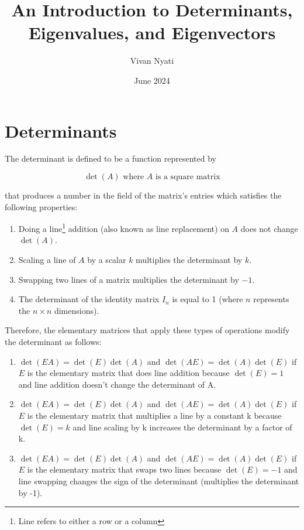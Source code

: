 \documentclass{article}
\title{An Introduction to Determinants, Eigenvalues, and Eigenvectors}
\author{Vivan Nyati}
\date{June 2024}
\begin{document}
\maketitle

\section*{Determinants}

The determinant is defined to be a function represented by 

\[
\text{$\det(A)$ where $A$ is a square matrix}
\]

\vspace{1mm}

that produces a number in the field of the matrix's entries which satisfies the following properties:

\begin{enumerate}
    \item Doing a line\footnote{Line refers to either a row or a column} addition (also known as line replacement) on \(A\) does not change \(\det(A)\).
    \item Scaling a line of \(A\) by a scalar \(k\) multiplies the determinant by \(k\).
    \item Swapping two lines of a matrix multiplies the determinant by \(-1\).
    \item The determinant of the identity matrix \(I_n\) is equal to 1 (where \(n\) represents the \(n \times n\) dimensions).
\end{enumerate}

Therefore, the elementary matrices that apply these types of operations modify the determinant as follows:

\begin{enumerate}
    \item \(\det(EA) = \det(E)\det(A)\) and \(\det(AE) = \det(A)\det(E)\) if \(E\) is the elementary matrix that does line addition because \(\det(E) = 1\) and line addition doesn't change the determinant of A.
    \item \(\det(EA) = \det(E)\det(A)\) and \(\det(AE) = \det(A)\det(E)\) if \(E\) is the elementary matrix that multiplies a line by a constant k because \(\det(E) = k\) and line scaling by k increases the determinant by a factor of k.
    \item \(\det(EA) = \det(E)\det(A)\) and \(\det(AE) = \det(A)\det(E)\) if \(E\) is the elementary matrix that swaps two lines because \(\det(E) = -1\) and line swapping changes the sign of the determinant (multiplies the determinant by -1).
\end{enumerate}
\end{document}
